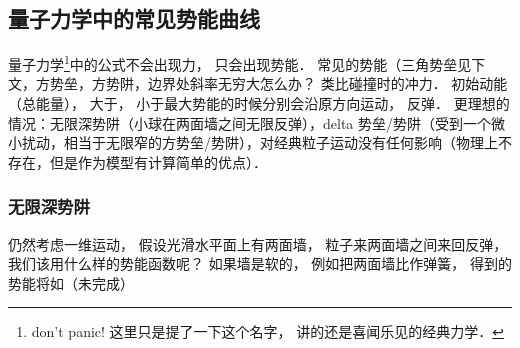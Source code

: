 \subsection{量子力学中的常见势能曲线}

量子力学\footnote{don't panic! 这里只是提了一下这个名字， 讲的还是喜闻乐见的经典力学．}中的公式不会出现力， 只会出现势能． 常见的势能（三角势垒见下文，方势垒，方势阱，边界处斜率无穷大怎么办？ 类比碰撞时的冲力． 初始动能（总能量）， 大于， 小于最大势能的时候分别会沿原方向运动， 反弹． 更理想的情况：无限深势阱（小球在两面墙之间无限反弹），delta 势垒/势阱（受到一个微小扰动，相当于无限窄的方势垒/势阱），对经典粒子运动没有任何影响（物理上不存在，但是作为模型有计算简单的优点）．

\subsubsection{无限深势阱}
仍然考虑一维运动， 假设光滑水平面上有两面墙， 粒子来两面墙之间来回反弹， 我们该用什么样的势能函数呢？ 如果墙是软的， 例如把两面墙比作弹簧， 得到的势能将如（未完成）